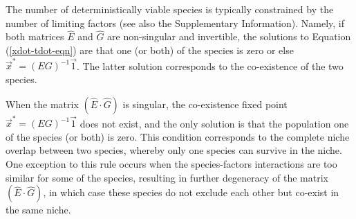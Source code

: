 %
%
The number of deterministically viable species is typically constrained by the number of limiting factors \cite{Armstrong1980} (see also the Supplementary Information).  Namely, if both matrices $\hat{E}$ and $ \hat{G}$ are non-singular and invertible, the solutions to Equation (\ref{xdot-tdot-eqn}) are that one (or both) of the species is zero or else $\vec{x}^* = (E G)^{-1}\vec{1}$. The latter solution corresponds to the co-existence of the two species.

When the matrix $(\hat{E}\cdot\hat{G})$ is singular, the co-existence fixed point $\vec{x}^* = (E G)^{-1}\vec{1}$ does not exist, and the only solution is that the population one of the species (or both) is zero. This condition corresponds to the complete niche overlap between two species, whereby only one species can survive in the niche. One exception to this rule occurs when the species-factors interactions are too similar for some of the species, resulting in further degeneracy of the matrix $(\hat{E}\cdot\hat{G})$, in which case these species do not exclude each other but co-exist in the same niche.

